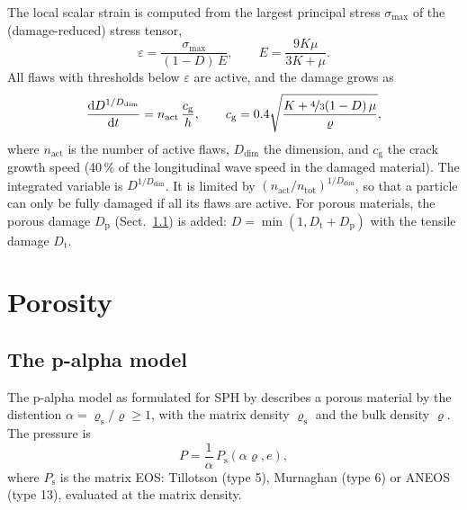 \documentclass[10pt,fleqn,twoside]{article}
\newcommand{\dd}{\mathrm{d}}
\begin{document}
The local scalar strain is computed from the largest principal stress $\sigma_\mathrm{max}$ of the (damage-reduced)
stress tensor,
\begin{equation}
 \varepsilon = \frac{\sigma_\mathrm{max}}{(1-D)\,E}, \qquad E = \frac{9K\mu}{3K+\mu}.
\end{equation}
All flaws with thresholds below $\varepsilon$ are active, and the damage grows as
\begin{equation}
 \frac{\dd D^{1/D_\mathrm{dim}}}{\dd t} = n_\mathrm{act}\,\frac{c_\mathrm{g}}{h},\qquad
 c_\mathrm{g} = 0.4\sqrt{\frac{K + \nicefrac{4}{3}(1-D)\,\mu}{\varrho}},
\end{equation}
where $n_\mathrm{act}$ is the number of active flaws, $D_\mathrm{dim}$ the dimension, and $c_\mathrm{g}$ the crack
growth speed (40\,\% of the longitudinal wave speed in the damaged material). The integrated variable is
$D^{1/D_\mathrm{dim}}$. It is limited by $(n_\mathrm{act}/n_\mathrm{tot})^{1/D_\mathrm{dim}}$, so that a particle can
only be fully damaged if all its flaws are active. For porous materials, the porous damage $D_\mathrm{p}$
(Sect.~\ref{sec:palpha}) is added: $D = \min(1, D_\mathrm{t} + D_\mathrm{p})$ with the tensile damage $D_\mathrm{t}$.


\section{Porosity}
\label{sec:porosity}

\subsection{The p-alpha model}
\label{sec:palpha}
The p-alpha model \citep{herrmann1969} as formulated for SPH by \citet{2008Icar..198..242J} describes a porous
material by the distention $\alpha = \varrho_\mathrm{s}/\varrho \geq 1$, with the matrix density
$\varrho_\mathrm{s}$ and the bulk density $\varrho$. The pressure is
\begin{equation}
 P = \frac{1}{\alpha}\,P_\mathrm{s}(\alpha\varrho, e),
\end{equation}
where $P_\mathrm{s}$ is the matrix EOS: Tillotson (type 5), Murnaghan (type 6) or ANEOS (type 13), evaluated at the
matrix density.
\end{document}
